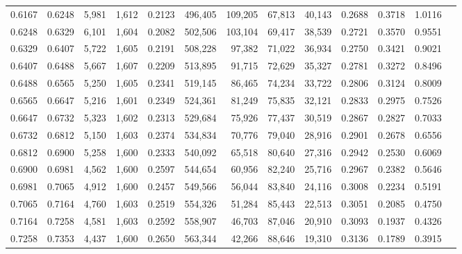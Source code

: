 \begin{tabular}{rrrrrrrrrrrrr}
0.6167 & 0.6248 &  5,981 & 1,612 &                                     0.2123 & 496,405 & 109,205 &  67,813 &  40,143 & 0.2688 & 0.3718 & 1.0116 \\
0.6248 & 0.6329 &  6,101 & 1,604 &                                     0.2082 & 502,506 & 103,104 &  69,417 &  38,539 & 0.2721 & 0.3570 & 0.9551 \\
0.6329 & 0.6407 &  5,722 & 1,605 &                                     0.2191 & 508,228 &  97,382 &  71,022 &  36,934 & 0.2750 & 0.3421 & 0.9021 \\
0.6407 & 0.6488 &  5,667 & 1,607 &                                     0.2209 & 513,895 &  91,715 &  72,629 &  35,327 & 0.2781 & 0.3272 & 0.8496 \\
0.6488 & 0.6565 &  5,250 & 1,605 &                                     0.2341 & 519,145 &  86,465 &  74,234 &  33,722 & 0.2806 & 0.3124 & 0.8009 \\
0.6565 & 0.6647 &  5,216 & 1,601 &                                     0.2349 & 524,361 &  81,249 &  75,835 &  32,121 & 0.2833 & 0.2975 & 0.7526 \\
0.6647 & 0.6732 &  5,323 & 1,602 &                                     0.2313 & 529,684 &  75,926 &  77,437 &  30,519 & 0.2867 & 0.2827 & 0.7033 \\
0.6732 & 0.6812 &  5,150 & 1,603 &                                     0.2374 & 534,834 &  70,776 &  79,040 &  28,916 & 0.2901 & 0.2678 & 0.6556 \\
0.6812 & 0.6900 &  5,258 & 1,600 &                                     0.2333 & 540,092 &  65,518 &  80,640 &  27,316 & 0.2942 & 0.2530 & 0.6069 \\
0.6900 & 0.6981 &  4,562 & 1,600 &                                     0.2597 & 544,654 &  60,956 &  82,240 &  25,716 & 0.2967 & 0.2382 & 0.5646 \\
0.6981 & 0.7065 &  4,912 & 1,600 &                                     0.2457 & 549,566 &  56,044 &  83,840 &  24,116 & 0.3008 & 0.2234 & 0.5191 \\
0.7065 & 0.7164 &  4,760 & 1,603 &                                     0.2519 & 554,326 &  51,284 &  85,443 &  22,513 & 0.3051 & 0.2085 & 0.4750 \\
0.7164 & 0.7258 &  4,581 & 1,603 &                                     0.2592 & 558,907 &  46,703 &  87,046 &  20,910 & 0.3093 & 0.1937 & 0.4326 \\
0.7258 & 0.7353 &  4,437 & 1,600 &                                     0.2650 & 563,344 &  42,266 &  88,646 &  19,310 & 0.3136 & 0.1789 & 0.3915 \\

\end{tabular}
